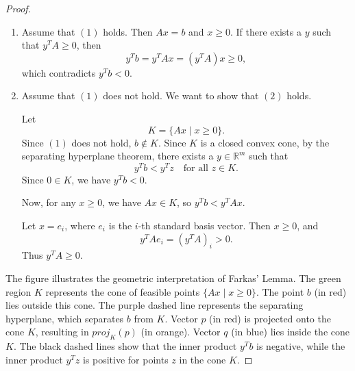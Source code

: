 \begin{proof}
	\begin{enumerate}
		\item[] Assume that \((1)\) holds. Then \(Ax = b\) and \(x \ge 0\). If there exists a \(y\) such that \(y^T A \ge 0\), then
		      \[
			      y^T b = y^T Ax = (y^T A)x \ge 0,
		      \]
		      which contradicts \(y^T b < 0\).
		\item[] Assume that \((1)\) does not hold. We want to show that \((2)\) holds.

		      Let
		      \[
			      K = \{Ax \mid x \ge 0\}.
		      \]
		      Since \((1)\) does not hold, \(b \notin K\). Since \(K\) is a closed convex cone, by the separating hyperplane theorem, there exists a \(y \in \mathbb{R}^m\) such that
		      \[
			      y^T b < y^T z \quad \text{for all } z \in K.
		      \]
		      Since \(0 \in K\), we have \(y^T b < 0\).

		      Now, for any \(x \ge 0\), we have \(Ax \in K\), so \(y^T b < y^T Ax\).

		      Let \(x = e_i\), where \(e_i\) is the \(i\)-th standard basis vector. Then \(x \ge 0\), and
		      \[
			      y^T A e_i = (y^T A)_i > 0.
		      \]
		      Thus \(y^T A \ge 0\).
	\end{enumerate}

	\begin{center}
	\end{center}

	The figure illustrates the geometric interpretation of Farkas' Lemma. The green region $K$ represents the cone of feasible points $\{Ax \mid x \ge 0\}$. The point $b$ (in red) lies outside this cone. The purple dashed line represents the separating hyperplane, which separates $b$ from $K$. Vector $p$ (in red) is projected onto the cone $K$, resulting in $proj_K(p)$ (in orange). Vector $q$ (in blue) lies inside the cone $K$. The black dashed lines show that the inner product $y^Tb$ is negative, while the inner product $y^Tz$ is positive for points $z$ in the cone $K$.
\end{proof}

